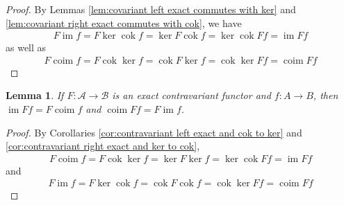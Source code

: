 \documentclass{article}
\newcommand{\fA}{\mathscr{A}}
\newcommand{\fB}{\mathscr{B}}
\DeclareMathOperator{\im}{im}
\DeclareMathOperator{\coim}{coim}
\DeclareMathOperator{\cok}{cok}
\newtheorem{lemma}[theorem]{Lemma}
\begin{document}
\begin{proof}
    By Lemmas \ref{lem:covariant left exact commutes with ker} and \ref{lem:covariant right exact commutes with cok}, we have
    \begin{align*}
        F\im f=F\ker \cok f=\ker F\cok f=\ker \cok Ff=\im Ff
    \end{align*}
    as well as
    \begin{align*}
        F\coim f=F\cok \ker f=\cok F\ker f=\cok \ker Ff=\coim Ff
    \end{align*}
\end{proof}
\begin{lemma}\label{lem:contravariant exact and im to coim and coim to im}
     If $F:\fA \to \fB$ is an exact contravariant functor and $f:A\to B$, then $\im Ff=F\coim f$ and $\coim Ff=F\im f$.
\end{lemma}
\begin{proof}
    By Corollaries \ref{cor:contravariant left exact and cok to ker} and \ref{cor:contravariant right exact and ker to cok},
    \begin{align*}
        F\coim f=F\cok \ker f=\ker F\ker f=\ker \cok Ff=\im Ff
    \end{align*}
    and
    \begin{align*}
        F\im f=F\ker \cok f=\cok F\cok f=\cok \ker Ff=\coim Ff
    \end{align*}
\end{proof}
\end{document}

